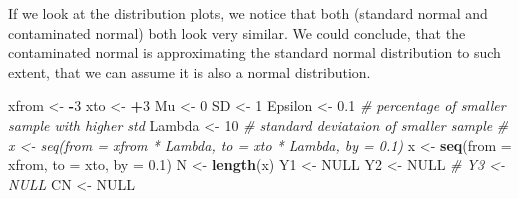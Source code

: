 \documentclass[
]{article}
\newenvironment{Shaded}{\begin{snugshade}}{\end{snugshade}}
\newcommand{\AttributeTok}[1]{\textcolor[rgb]{0.13,0.29,0.53}{#1}}
\newcommand{\CommentTok}[1]{\textcolor[rgb]{0.56,0.35,0.01}{\textit{#1}}}
\newcommand{\ConstantTok}[1]{\textcolor[rgb]{0.56,0.35,0.01}{#1}}
\newcommand{\DecValTok}[1]{\textcolor[rgb]{0.00,0.00,0.81}{#1}}
\newcommand{\FloatTok}[1]{\textcolor[rgb]{0.00,0.00,0.81}{#1}}
\newcommand{\FunctionTok}[1]{\textcolor[rgb]{0.13,0.29,0.53}{\textbf{#1}}}
\newcommand{\NormalTok}[1]{#1}
\newcommand{\OtherTok}[1]{\textcolor[rgb]{0.56,0.35,0.01}{#1}}
\newcommand{\SpecialCharTok}[1]{\textcolor[rgb]{0.81,0.36,0.00}{\textbf{#1}}}
\begin{document}
If we look at the distribution plots, we notice that both (standard normal and contaminated normal) both look very similar. We could conclude, that the contaminated normal is approximating the standard normal distribution to such extent, that we can assume it is also a normal distribution.

\begin{Shaded}
\begin{Highlighting}[]
\NormalTok{  xfrom  }\OtherTok{\textless{}{-}} \SpecialCharTok{{-}}\DecValTok{3}
\NormalTok{  xto    }\OtherTok{\textless{}{-}} \SpecialCharTok{+}\DecValTok{3}
\NormalTok{  Mu     }\OtherTok{\textless{}{-}} \DecValTok{0}
\NormalTok{  SD     }\OtherTok{\textless{}{-}} \DecValTok{1}
\NormalTok{  Epsilon  }\OtherTok{\textless{}{-}} \FloatTok{0.1} \CommentTok{\# percentage of smaller sample with higher std}
\NormalTok{  Lambda }\OtherTok{\textless{}{-}} \DecValTok{10}  \CommentTok{\# standard deviataion of smaller sample}
  \CommentTok{\# x      \textless{}{-} seq(from = xfrom * Lambda, to = xto * Lambda, by = 0.1)}
\NormalTok{  x      }\OtherTok{\textless{}{-}} \FunctionTok{seq}\NormalTok{(}\AttributeTok{from =}\NormalTok{ xfrom, }\AttributeTok{to =}\NormalTok{ xto, }\AttributeTok{by =} \FloatTok{0.1}\NormalTok{)}
\NormalTok{  N      }\OtherTok{\textless{}{-}} \FunctionTok{length}\NormalTok{(x)}
\NormalTok{  Y1     }\OtherTok{\textless{}{-}} \ConstantTok{NULL}
\NormalTok{  Y2     }\OtherTok{\textless{}{-}} \ConstantTok{NULL}
  \CommentTok{\# Y3     \textless{}{-} NULL}
\NormalTok{  CN     }\OtherTok{\textless{}{-}} \ConstantTok{NULL}
  

\end{Highlighting}
\end{Shaded}
\end{document}
